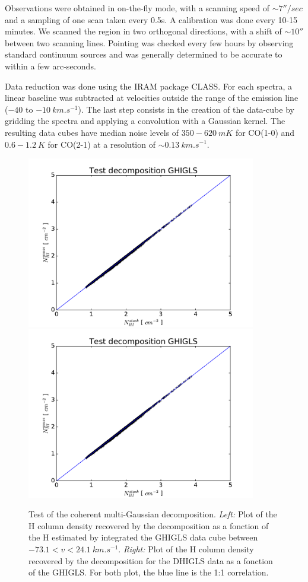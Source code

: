 \documentclass[traditabstract]{aa}
\begin{document}
   Observations were obtained in on-the-fly mode, with a scanning speed of $\sim 7''/sec$ and a sampling of one scan taken every 0.5s. A calibration was done every 10-15 minutes. We scanned the region in two orthogonal directions, with a shift of $\sim 10''$ between two scanning lines. Pointing was checked every few hours by observing standard continuum sources and was generally determined to be accurate to within a few arc-seconds.

Data reduction was done using the IRAM package CLASS. For each spectra, a linear baseline was subtracted at velocities outside the range of the emission line ($-40$ to $-10\: km.s^{-1}$). The last step consists in the creation of the data-cube by gridding the spectra and applying a convolution with a Gaussian kernel. The resulting data cubes have median noise levels of $350-620\: mK$ for CO(1-0) and $0.6-1.2\: K$ for CO(2-1) at a resolution of $\sim 0.13\: km.s^{-1}$.

\begin{figure}
  \centering
  \includegraphics[page=1,height=7.5cm,trim=35 0 50 20,clip=true]{Figures/Test_decomposition.pdf}
  \includegraphics[page=3,height=7.5cm,trim=20 0 45 20,clip=true]{Figures/Test_decomposition.pdf}
  \caption{\label{Test} Test of the coherent multi-Gaussian decomposition. \emph{Left:} Plot of the H column density recovered by the decomposition as a fonction of the H estimated by integrated the GHIGLS data cube between $-73.1<v<24.1\: km.s^{-1}$. \emph{Right:} Plot of the H column density recovered by the decomposition for the DHIGLS data as a fonction of the GHIGLS. For both plot, the blue line is the 1:1 correlation.}
\end{figure}
\end{document}
